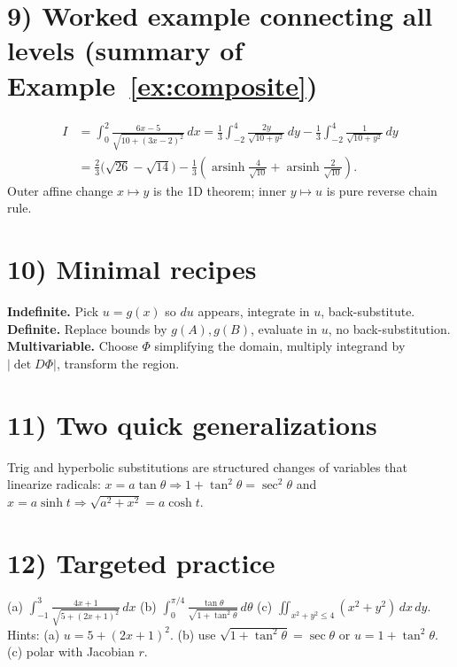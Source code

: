\documentclass[12pt]{article}
\begin{document}
\section*{9) Worked example connecting all levels (summary of Example~\ref{ex:composite})}
\begin{align*}
I&=\int_{0}^{2}\frac{6x-5}{\sqrt{10+(3x-2)^2}}\,dx
=\frac{1}{3}\int_{-2}^{4}\frac{2y}{\sqrt{10+y^2}}\,dy
-\frac{1}{3}\int_{-2}^{4}\frac{1}{\sqrt{10+y^2}}\,dy\\
&=\frac{2}{3}\big(\sqrt{26}-\sqrt{14}\big)
-\frac{1}{3}\!\left(\operatorname{arsinh}\frac{4}{\sqrt{10}}+\operatorname{arsinh}\frac{2}{\sqrt{10}}\right).
\end{align*}
Outer affine change \(x\mapsto y\) is the 1D theorem; inner \(y\mapsto u\) is pure reverse chain rule.

\section*{10) Minimal recipes}
\textbf{Indefinite.} Pick \(u=g(x)\) so \(du\) appears, integrate in \(u\), back-substitute.\\
\textbf{Definite.} Replace bounds by \(g(A),g(B)\), evaluate in \(u\), no back-substitution.\\
\textbf{Multivariable.} Choose \(\Phi\) simplifying the domain, multiply integrand by \(|\det D\Phi|\), transform the region.

\section*{11) Two quick generalizations}
Trig and hyperbolic substitutions are structured changes of variables that linearize radicals:
\(x=a\tan\theta\Rightarrow 1+\tan^2\theta=\sec^2\theta\) and \(x=a\sinh t\Rightarrow \sqrt{a^2+x^2}=a\cosh t\).

\section*{12) Targeted practice}
(a) \(\displaystyle \int_{-1}^{3}\frac{4x+1}{\sqrt{5+(2x+1)^2}}\,dx\) \quad
(b) \(\displaystyle \int_{0}^{\pi/4}\frac{\tan\theta}{\sqrt{1+\tan^2\theta}}\,d\theta\) \quad
(c) \(\displaystyle \iint_{x^2+y^2\le 4} (x^2+y^2)\,dx\,dy\).\\
Hints: (a) \(u=5+(2x+1)^2\). (b) use \(\sqrt{1+\tan^2\theta}=\sec\theta\) or \(u=1+\tan^2\theta\). (c) polar with Jacobian \(r\).
\end{document}
